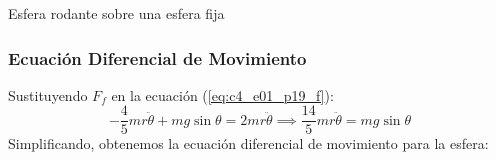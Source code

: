\begin{solucion}{Esfera rodante sobre una esfera fija}
\subsubsection*{Ecuación Diferencial de Movimiento}

Sustituyendo $F_f$ en la ecuación (\ref{eq:c4_e01_p19_f}):
\begin{equation}
    -\frac{4}{5}mr\ddot{\theta} + mg\sin\theta = 2mr\ddot{\theta} \implies \frac{14}{5}mr\ddot{\theta} = mg\sin\theta
\end{equation}
Simplificando, obtenemos la ecuación diferencial de movimiento para la esfera:
\end{solucion}
